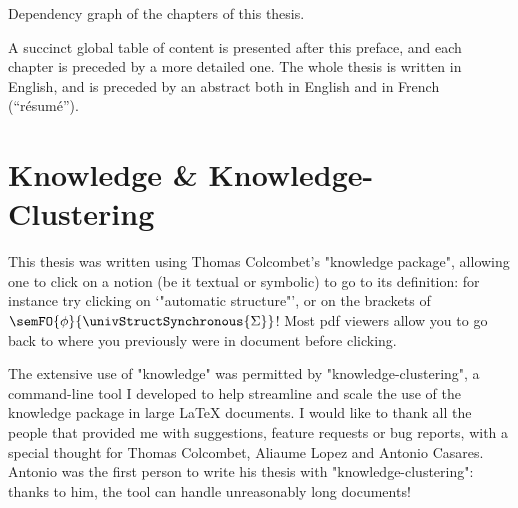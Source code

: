 \begin{marginfigure}
	\centering
	\caption{\AP\label{fig:chapter-dependency-graph}
		Dependency graph of the chapters of this thesis.}
\end{marginfigure}
A succinct global table of content is presented after this preface,
and each chapter is preceded by a more detailed one.
The whole thesis is written in English, and is preceded by an abstract both in English
and in French (``résumé'').

\section*{Knowledge \& Knowledge-Clustering}
This thesis was written using Thomas Colcombet's "knowledge package", allowing
one to click on a notion (be it textual or symbolic) to go to its definition:
for instance try clicking on `"automatic structure"', or on the brackets of
$\semFO{\phi}{\univStructSynchronous{\Sigma}}$!
Most pdf viewers allow you to go back to where you previously were
in document before clicking.

The extensive use of "knowledge" was permitted by "knowledge-clustering",
a command-line tool I developed to help streamline and scale the use
of the knowledge package in large LaTeX documents.
I would like to thank all the people that provided me with suggestions,
feature requests or bug reports, with a special thought for Thomas Colcombet, Aliaume Lopez
and Antonio Casares. Antonio was the first person to write his thesis
with "knowledge-clustering": thanks to him, the tool can handle
unreasonably long documents!

